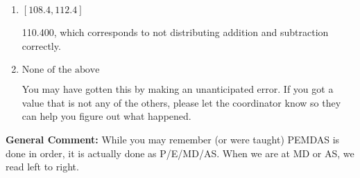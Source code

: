\documentclass{extbook}[14pt]
\begin{document}
\begin{enumerate}
{\begin{enumerate}[label=\Alph*.]
 -79.600, which corresponds to an Order of Operations error: not reading left-to-right for multiplication/division.
\item \( [108.4, 112.4] \)

 110.400, which corresponds to not distributing addition and subtraction correctly.
\item \( \text{None of the above} \)

 You may have gotten this by making an unanticipated error. If you got a value that is not any of the others, please let the coordinator know so they can help you figure out what happened.
\end{enumerate}

\textbf{General Comment:} While you may remember (or were taught) PEMDAS is done in order, it is actually done as P/E/MD/AS. When we are at MD or AS, we read left to right.
}
\end{enumerate}
\end{document}
